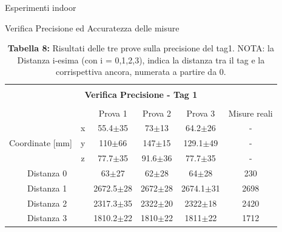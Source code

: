 \documentclass[12pt]{report}
\begin{document}
\begin{section}{Esperimenti indoor}
\begin{subsection}{Verifica Precisione ed Accuratezza delle misure}
			\begin{table}[H]
				\centering
				\begin{tabular}{|c|c|c|c|c|c|}
					\hline
					\multicolumn{6}{|c|}{}\\
					\multicolumn{6}{|c|}{\textbf{\Large Verifica Precisione - Tag 1}}\\
					\multicolumn{6}{|c|}{}\\
					\hline
					\multicolumn{2}{|c|}{}&												Prova 1&							Prova 2&						Prova 3&					Misure reali\\
					\hline
					\multirow{3}{*}{Coordinate [mm]}&			x&					55.4$\pm$35&					73$\pm$13&					64.2$\pm$26&			-\\
					\cline{2-6}
					&																y&					110$\pm$66&					147$\pm$15&				129.1$\pm$49&		-\\
					\cline{2-6}
					&																z&					77.7$\pm$35&					91.6$\pm$36&				77.7$\pm$35&			-\\
					\hline
					\multicolumn{2}{|c|}{Distanza 0}&								63$\pm$27&						62$\pm$28&					64$\pm$28&				230\\
					\hline
					\multicolumn{2}{|c|}{Distanza 1}&								2672.5$\pm$28&				2672$\pm$28&				2674.1$\pm$31&		2698\\
					\hline
					\multicolumn{2}{|c|}{Distanza 2}&								2317.3$\pm$35&				2322$\pm$20&				2322$\pm$18&			2420\\
					\hline
					\multicolumn{2}{|c|}{Distanza 3}&								1810.2$\pm$22&				1810$\pm$22&				1811$\pm$22&			1712\\
					\hline
				\end{tabular}
				\caption{\textbf{Tabella 8: } Risultati delle tre prove sulla precisione del tag1. NOTA: la Distanza i-esima (con i = 0,1,2,3), indica la distanza tra il tag e la corrispettiva ancora, numerata a partire da 0.\label{EspPrecis1}}
			\end{table}


\end{subsection}
\end{section}
\end{document}
